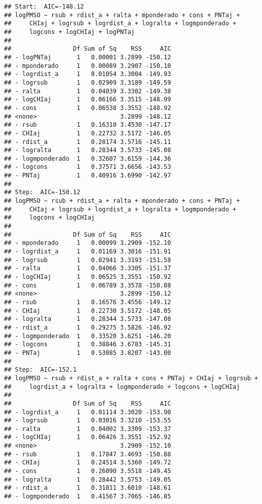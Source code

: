 \documentclass[
]{article}
\begin{document}
\begin{verbatim}
## Start:  AIC=-148.12
## logPMSO ~ rsub + rdist_a + ralta + mponderado + cons + PNTaj + 
##     CHIaj + logrsub + logrdist_a + logralta + logmponderado + 
##     logcons + logCHIaj + logPNTaj
## 
##                 Df Sum of Sq    RSS     AIC
## - logPNTaj       1   0.00001 3.2899 -150.12
## - mponderado     1   0.00089 3.2907 -150.10
## - logrdist_a     1   0.01054 3.3004 -149.93
## - logrsub        1   0.02909 3.3189 -149.59
## - ralta          1   0.04039 3.3302 -149.38
## - logCHIaj       1   0.06166 3.3515 -148.99
## - cons           1   0.06538 3.3552 -148.92
## <none>                       3.2899 -148.12
## - rsub           1   0.16310 3.4530 -147.17
## - CHIaj          1   0.22732 3.5172 -146.05
## - rdist_a        1   0.28174 3.5716 -145.11
## - logralta       1   0.28344 3.5733 -145.08
## - logmponderado  1   0.32607 3.6159 -144.36
## - logcons        1   0.37571 3.6656 -143.53
## - PNTaj          1   0.40916 3.6990 -142.97
## 
## Step:  AIC=-150.12
## logPMSO ~ rsub + rdist_a + ralta + mponderado + cons + PNTaj + 
##     CHIaj + logrsub + logrdist_a + logralta + logmponderado + 
##     logcons + logCHIaj
## 
##                 Df Sum of Sq    RSS     AIC
## - mponderado     1   0.00099 3.2909 -152.10
## - logrdist_a     1   0.01169 3.3016 -151.91
## - logrsub        1   0.02941 3.3193 -151.58
## - ralta          1   0.04066 3.3305 -151.37
## - logCHIaj       1   0.06525 3.3551 -150.92
## - cons           1   0.06789 3.3578 -150.88
## <none>                       3.2899 -150.12
## - rsub           1   0.16576 3.4556 -149.12
## - CHIaj          1   0.22730 3.5172 -148.05
## - logralta       1   0.28344 3.5733 -147.08
## - rdist_a        1   0.29275 3.5826 -146.92
## - logmponderado  1   0.33520 3.6251 -146.20
## - logcons        1   0.38846 3.6783 -145.31
## - PNTaj          1   0.53085 3.8207 -143.00
## 
## Step:  AIC=-152.1
## logPMSO ~ rsub + rdist_a + ralta + cons + PNTaj + CHIaj + logrsub + 
##     logrdist_a + logralta + logmponderado + logcons + logCHIaj
## 
##                 Df Sum of Sq    RSS     AIC
## - logrdist_a     1   0.01114 3.3020 -153.90
## - logrsub        1   0.03016 3.3210 -153.55
## - ralta          1   0.04002 3.3309 -153.37
## - logCHIaj       1   0.06426 3.3551 -152.92
## <none>                       3.2909 -152.10
## - rsub           1   0.17847 3.4693 -150.88
## - CHIaj          1   0.24514 3.5360 -149.72
## - cons           1   0.26090 3.5518 -149.45
## - logralta       1   0.28442 3.5753 -149.05
## - rdist_a        1   0.31011 3.6010 -148.61
## - logmponderado  1   0.41567 3.7065 -146.85

\end{verbatim}
\end{document}
